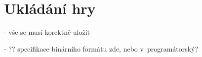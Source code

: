 
\section{Ukládání hry}

- vše se musí korektně uložit

- ?? specifikace binárního formátu zde, nebo v~programátorský?
